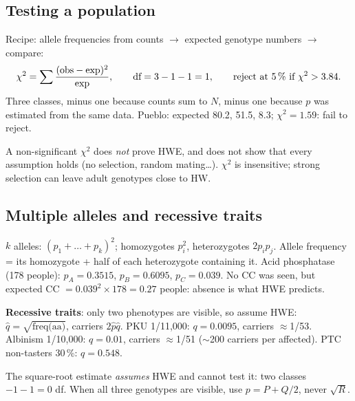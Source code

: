 \subsection{Testing a population}
Recipe: allele frequencies from counts $\to$ expected genotype numbers $\to$ compare:
\[
\chi^2=\sum\frac{(\text{obs}-\text{exp})^2}{\text{exp}},\qquad \text{df}=3-1-1=1,\qquad \text{reject at 5\,\% if }\chi^2>3.84 .
\]
Three classes, minus one because counts sum to $N$, minus one because $p$ was estimated from the same data.
Pueblo: expected 80.2, 51.5, 8.3; $\chi^2=1.59$: fail to reject.

\begin{trap}
A non-significant $\chi^2$ does \emph{not} prove HWE, and does not show that every assumption holds (no selection, random
mating\dots). $\chi^2$ is insensitive; strong selection can leave adult genotypes close to HW.
\end{trap}

\subsection{Multiple alleles and recessive traits}
$k$ alleles: $(p_1+\dots+p_k)^2$; homozygotes $p_i^2$, heterozygotes $2p_ip_j$. Allele frequency = its homozygote +
half of each heterozygote containing it. Acid phosphatase (178 people): $p_A=0.3515$, $p_B=0.6095$, $p_C=0.039$. No CC
was seen, but expected CC $=0.039^2\times178=0.27$ people: absence is what HWE predicts.

\textbf{Recessive traits}: only two phenotypes are visible, so assume HWE: $\hat q=\sqrt{\text{freq(aa)}}$, carriers $2\hat p\hat q$.
PKU 1/11{,}000: $q=0.0095$, carriers $\approx$1/53. Albinism 1/10{,}000: $q=0.01$, carriers $\approx$1/51 ($\sim$200 carriers per
affected). PTC non-tasters 30\,\%: $q=0.548$.

\begin{trap}
The square-root estimate \emph{assumes} HWE and cannot test it: two classes $-1-1=0$ df. When all three genotypes are
visible, use $p=P+Q/2$, never $\sqrt{R}$.
\end{trap}

